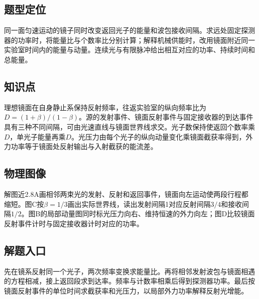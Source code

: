\documentclass[UTF8,fontset=fandol,a4paper,11pt]{ctexart}
\begin{document}


\subsection*{题型定位}

同一面匀速运动的镜子同时改变返回光子的能量和波包接收间隔。求远处固定探测器的功率时，将能量比与个数率比分别计算；解释机械供能时，改用镜面附近同一实验室时间内的能量与动量。连续光与有限脉冲给出相互对应的功率、持续时间和总能量。



\subsection*{知识点}

理想镜面在自身静止系保持反射频率，往返实验室的纵向频率比为$D=(1+\beta)/(1-\beta)$。源的发射事件、镜面反射事件与固定接收器的到达事件具有三种不同间隔，可由光速直线与镜面世界线求交。光子数保持使返回个数率乘$D$，单光子能量再乘$D$。光压力由每个光子的纵向动量变化乘镜面截获率得到，外力功率等于镜面处反射输出与入射截获的能流差。



\subsection*{物理图像}

解图近2.8A画相邻两束光的发射、反射和返回事件，镜面向左运动使两段行程都缩短。图C按$\beta=1/3$画出实际世界线，读出发射间隔1对应反射间隔$3/4$和接收间隔$1/2$。图B的局部动量图同时标光压力向右、维持恒速的外力向左；图D比较镜面反射事件计时与固定接收器计时对应的功率。



\subsection*{解题入口}

先在镜系反射同一个光子，两次频率变换求能量比。再将相邻发射波包与镜面相遇的方程相减，接上返回段求到达率。频率与计数率相乘后得到探测器功率。最后按镜面反射事件的单位时间求截获率和光压力，以局部外力功率解释反射光增能。
\end{document}
